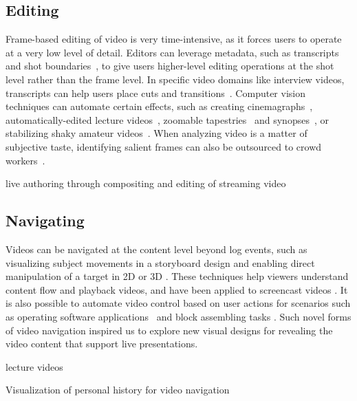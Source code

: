 
\subsection{Editing}
Frame-based editing of video is very time-intensive, as it forces users to operate at a very low level of detail. Editors can leverage metadata, such as transcripts~\cite{Berthouzoz:2012,Pavel:2014:VDB:2642918.2647400} and shot boundaries~\cite{Casares:2002dx}, to give users higher-level editing operations at the shot level rather than the frame level.
In specific video domains like interview videos, transcripts can help users place cuts and transitions~\cite{Berthouzoz:2012}.
%
Computer vision techniques can automate certain effects, such as creating cinemagraphs~\cite{Bai:2012, Joshi:2012}, automatically-edited lecture videos~\cite{Heck:2007}, zoomable tapestries~\cite{Barnes:2010} and synopses~\cite{Pritch:2009vl}, or stabilizing shaky amateur videos~\cite{Liu:2011}. When analyzing video is a matter of subjective taste, identifying salient frames can also be outsourced to crowd workers~\cite{Bernstein:2011uj}.

live authoring through compositing and editing of streaming video~\cite{Freeman:2014:LLA:2611105.2557304}


\subsection{Navigating}
Videos can be navigated at the content level beyond log events, such as visualizing subject movements in a storyboard design \cite{goldman2006schematic} and enabling direct manipulation of a target in 2D \cite{Dragicevic:2008:VBD:1357054.1357096,Goldman:2008:VOA:1449715.1449719,Karrer:2008:DDM:1357054.1357097} or 3D \cite{Nguyen:2013:DMV:2470654.2466150}. These techniques help viewers understand content flow and playback videos, and have been applied to screencast videos \cite{Denoue:2013:RDM:2451176.2451190}. It is also possible to automate video control based on user actions for scenarios such as operating software applications~\cite{Pongnumkul:2011ju} and block assembling tasks \cite{Gupta:2012ku}. Such novel forms of video navigation inspired us to explore new visual designs for revealing the video content that support live presentations.

lecture videos~\cite{Tang:2006:DIU:1111449.1111523}

Visualization of personal history for video navigation~\cite{Al-Hajri:2014:VPH:2611105.2557106}

